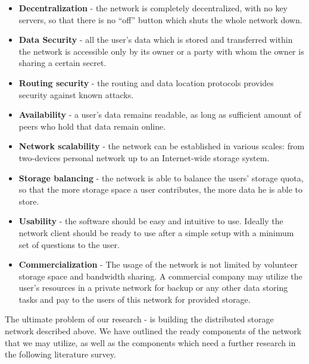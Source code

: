 \begin{itemize}
\item \textbf{Decentralization} - the network is completely decentralized,
      with no key servers, so that there is no ``off'' button which shuts
      the whole network down.
\item \textbf{Data Security} - all the user's data which is stored and transferred
      within the network is accessible only by its owner or a party with whom the
      owner is sharing a certain secret.
\item \textbf{Routing security} - the routing and data location protocols
      provides security against known attacks.
\item \textbf{Availability} - a user's data remains readable,
      as long as sufficient amount of peers who hold that data remain online.
\item \textbf{Network scalability} - the network can be established in various
      scales: from two-devices personal network up to an Internet-wide storage
      system.
\item \textbf{Storage balancing} - the network is able to balance the users'
      storage quota, so that the more storage space a user contributes,
      the more data he is able to store.
\item \textbf{Usability} - the software should be easy and intuitive to
      use. Ideally the network client should be ready to use after a
      simple setup with a minimum set of questions to the user.
\item \textbf{Commercialization} - The usage of the network is not limited
      by volunteer storage space and bandwidth sharing. A commercial company
      may utilize the user's resources in a private network for backup or any
      other data storing tasks and pay to the users of this network for
      provided storage.
\end{itemize}


The ultimate problem of our research - is building the distributed
storage network described above. We have outlined the ready
components of the network that we may utilize, as well as the
components which need a further research in the following literature
survey.



